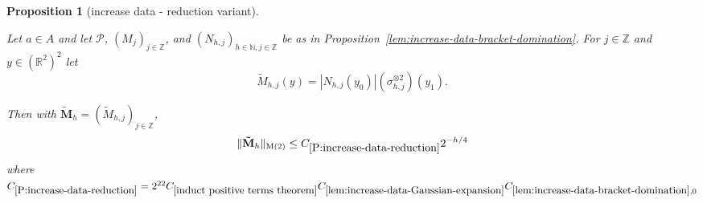 \documentclass[12pt,reqno]{amsart}
\theoremstyle{plain}
\newtheorem{proposition}[theorem]{Proposition}
\numberwithin{equation}{section}
\theoremstyle{remark}
\newcommand{\uses}[1]{}
\newcommand{\usesdefs}[1]{}
\newcommand{\leanok}{}
\newcommand{\lean}[1]{}
\newcommand{\Z}{{\mathbb Z}}
\newcommand{\R}{{\mathbb R}}
\newcommand{\N}{{\mathbb N}}
\begin{document}
\begin{proposition}[increase data - reduction variant]
\label{P:increase-data-reduction}\uses{lem:N-reduction,square root Gaussian difference W0,tensor Wiener,lem:increase-data-Gaussian-expansion,induct positive terms theorem,Monotonicity K,prism BL inequality,lem:increase-data-bracket-domination}\usesdefs{auto:Wiener-space-definition,multiplicatively spaced monotone sequences,geometric parameters,kernel sequences,2D Gaussians,sandwich kernel,square root Gaussian difference,s multiplier}
\lean{Auto.increaseDataReduction}
\leanok
Let $a\in A$ and let $\mathcal P$, $(M_j)_{j\in \Z}$, and $(N_{h,j})_{h\in\N,j\in\Z}$ be as in Proposition~\ref{lem:increase-data-bracket-domination}.
 For $j\in \Z$ and $y\in (\R^2)^2$ let
    \begin{equation}\label{auto:increase-data-majorant-kernel}\tilde{M}_{h,j}(y) = |N_{h,j}(y_0)| (\sigma_{h,j}^{\otimes2})(y_1). \end{equation}

Then with $\mathbf{\tilde{M}}_h=(\tilde{M}_{h,j})_{j\in \Z}$,
    \begin{equation}\label{auto:increase-data-majorant-bound}\|\mathbf{\tilde{M}}_h\|_{\rm M(2)}\le C_{\ref{P:increase-data-reduction}} 2^{-h/4}\end{equation}
    where $C_{\ref{P:increase-data-reduction}} = 2^{22}C_{\ref{induct positive terms theorem}}C_{\ref{lem:increase-data-Gaussian-expansion}}C_{\ref{lem:increase-data-bracket-domination},0}$


\end{proposition}
\end{document}
